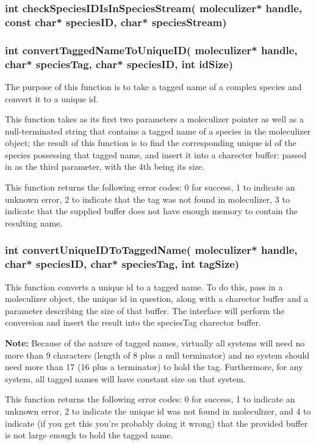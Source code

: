\subsubsection{int checkSpeciesIDIsInSpeciesStream( moleculizer* handle, const  char* speciesID, char* speciesStream)}

\subsubsection{int convertTaggedNameToUniqueID( moleculizer* handle, char*
  speciesTag, char* speciesID, int idSize)}
The purpose of this function is to take a tagged name of a complex
species and convert it to a unique id.

This function takes as its first two parameters a moleculizer pointer
as well as a null-terminated string that contains a tagged name of a
species in the moleculizer object; the result of this function is to
find the corresponding unique id of the species possessing that tagged
name, and insert it into a charecter buffer: passed in as the third
parameter, with the 4th being its size.

This function returns the following error codes: 0 for success, 1 to
indicate an unknown error, 2 to indicate that the tag was not found in
moleculizer, 3 to indicate that the supplied buffer does not have
enough memory to contain the resulting name.

\subsubsection{int convertUniqueIDToTaggedName( moleculizer* handle, char*
  speciesID, char* speciesTag, int tagSize)}
This function converts a unique id to a tagged name.  To do this, pass
in a moleculizer object, the unique id in question, along with a
charector buffer and a parameter describing the size of that buffer.
The interface will perform the conversion and insert the result into
the speciesTag charector buffer.

\textbf{Note:} Because of the nature of tagged names, virtually all
systems will need no more than 9 characters (length of 8 plus a null
terminator) and no system should need more than 17 (16 plus a
terminator) to hold the tag.  Furthermore, for any system, all tagged
names will have constant size on that system. 

This function returns the following error codes: 0 for success, 1 to
indicate an unknown error, 2 to indicate the unique id was not found
in moleculizer, and 4 to indicate (if you get this you're probably
doing it wrong) that the provided buffer is not large enough to hold
the tagged name.

